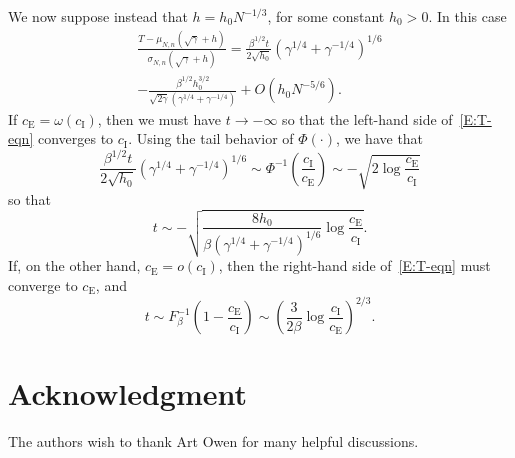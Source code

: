 \documentclass[final]{IEEEtran} %
\newcommand{\ce}{c_\text{E}}
\newcommand{\ci}{c_\text{I}}
\begin{document}
\begin{IEEEproof}
We now suppose instead that $h = h_0 N^{-1/3}$, for some constant
$h_0 > 0$.  In this case
\begin{multline*}
    \frac{ T - \mu_{N,n}(\sqrt{\gamma} + h)}
         { \sigma_{N,n}(\sqrt{\gamma} + h) }
    =
    \frac{\beta^{1/2} t}{2 \sqrt{ h_0 } }
    \left( \gamma^{1/4} + \gamma^{-1/4} \right)^{1/6}
    \\
    -
    \frac{\beta^{1/2} h_0^{3/2}}
         { \sqrt{ 2 \gamma } \left( \gamma^{1/4} + \gamma^{-1/4} \right) }
    +
    O( h_0 N^{-5/6 }).
\end{multline*}
If $\ce = \omega( \ci )$, then we must have $t \to -\infty$ so that the
left-hand side of~\eqref{E:T-eqn} converges to $\ci$.  Using the tail
behavior of $\Phi( \cdot )$, we have that
\[
    \frac{\beta^{1/2} t}{2 \sqrt{h_0}}
    \left(
        \gamma^{1/4} + \gamma^{-1/4}
    \right)^{1/6}
    \sim
    \Phi^{-1} \left( \frac{\ci}{\ce} \right)
    \sim
    -
    \sqrt{
        2 \log \frac{\ce}{\ci}
    }
\]
so that
\[
    t
    \sim
    -
    \sqrt{
        \frac{ 8 h_0 }{ \beta (\gamma^{1/4} + \gamma^{-1/4} )^{1/6} }
        \log \frac{\ce}{\ci}
    }.
\]
If, on the other hand, $\ce = o(\ci)$, then the right-hand side of~\eqref{E:T-eqn}
must converge to $\ce$, and
\[
    t
    \sim
    F_\beta^{-1} \left( 1 - \frac{\ce}{\ci} \right)
    \sim
    \left(
        \frac{3}{2 \beta}
        \log \frac{\ci}{\ce}
    \right)^{2/3}.
\]
\end{IEEEproof}

\section*{Acknowledgment}
The authors wish to thank Art Owen for many helpful discussions.



\end{document}
